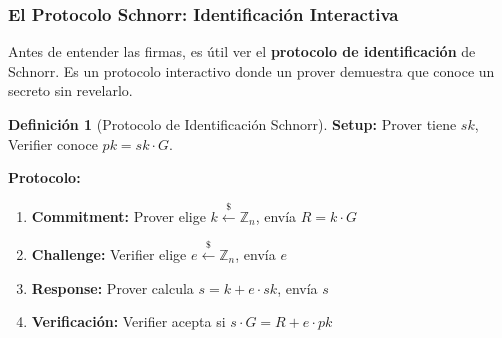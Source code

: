 \documentclass[11pt,a4paper,twoside,openright]{book}
\theoremstyle{definition}
\newtheorem{definition}{Definición}[chapter]
\theoremstyle{plain}
\theoremstyle{remark}
\newcommand{\Z}{\mathbb{Z}}
\begin{document}
\subsubsection{El Protocolo Schnorr: Identificación Interactiva}

\begin{intuicion}
Antes de entender las firmas, es útil ver el \textbf{protocolo de identificación} de Schnorr. Es un protocolo interactivo donde un prover demuestra que conoce un secreto sin revelarlo.
\end{intuicion}

\begin{definition}[Protocolo de Identificación Schnorr]
\textbf{Setup:} Prover tiene $sk$, Verifier conoce $pk = sk \cdot G$.

\textbf{Protocolo:}
\begin{enumerate}
    \item \textbf{Commitment:} Prover elige $k \xleftarrow{\$} \Z_n$, envía $R = k \cdot G$
    \item \textbf{Challenge:} Verifier elige $e \xleftarrow{\$} \Z_n$, envía $e$
    \item \textbf{Response:} Prover calcula $s = k + e \cdot sk$, envía $s$
    \item \textbf{Verificación:} Verifier acepta si $s \cdot G = R + e \cdot pk$
\end{enumerate}
\end{definition}

\begin{center}
\end{center}
\end{document}
